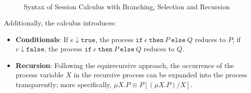 \begin{figure}[!hb]
\doublespacing
\[
\begin{array}{rlr}

%
%
%
%
\end{array}
\]

\singlespacing
\caption{Syntax of Session Calculus with Branching, Selection and Recursion}
\label{fig:sync}
\end{figure}


Additionally, the calculus introduces:

\begin{itemize}
\item \textbf{Conditionals}: If $e \downarrow \texttt{true}$, the process $\texttt{if}~e~\texttt{then}~P~\texttt{else}~Q$ reduces to $P$; if $e \downarrow \texttt{false}$, the process $\texttt{if}~e~\texttt{then}~P~\texttt{else}~Q$ reduces to $Q$.
\item \textbf{Recursion}: Following the equirecursive approach, the occurrence of the process variable $X$ in the recursive process can be expanded into the process transparently; more specifically, $\mu X. P \equiv P[(\mu X. P)/X]$.
\end{itemize}


